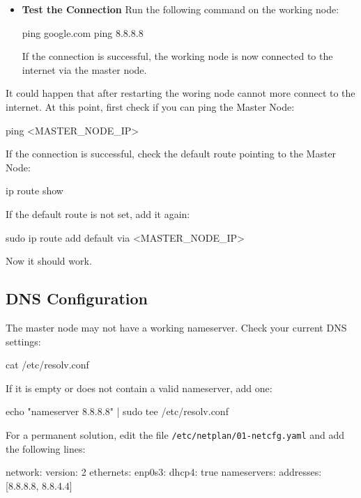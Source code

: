 \begin{itemize}
    \item \textbf{Test the Connection}
    Run the following command on the working node:
    \begin{codeblock}[language=bash]
ping google.com
ping 8.8.8.8
    \end{codeblock}
    If the connection is successful, the working node is now connected to the internet via the master node.
\end{itemize}

\begin{warningblock}
    It could happen that after restarting the woring node cannot more connect to the internet. At this point, first check if you can ping the Master Node:
    \begin{codeblock}[language=bash]
ping <MASTER\_NODE\_IP>
    \end{codeblock}
    If the connection is successful, check the default route pointing to the Master Node:
    \begin{codeblock}[language=bash]
ip route show
    \end{codeblock}
    If the default route is not set, add it again:
    \begin{codeblock}[language=bash]
sudo ip route add default via <MASTER\_NODE\_IP>
    \end{codeblock}
    Now it should work.
\end{warningblock}

\subsection{DNS Configuration}

The master node may not have a working nameserver. Check your current DNS settings:
\begin{codeblock}[language=bash]
cat /etc/resolv.conf
\end{codeblock}

If it is empty or does not contain a valid nameserver, add one:
\begin{codeblock}[language=bash]
echo "nameserver 8.8.8.8" | sudo tee /etc/resolv.conf
\end{codeblock}

For a permanent solution, edit the file \texttt{/etc/netplan/01-netcfg.yaml} and add the following lines:
\begin{codeblock}[language=bash]
network:
    version: 2
    ethernets:
        enp0s3:
            dhcp4: true
            nameservers:
                addresses: [8.8.8.8, 8.8.4.4]
\end{codeblock}

